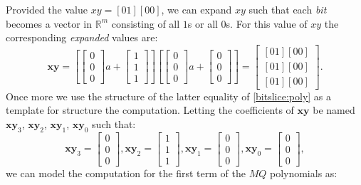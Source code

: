 Provided the value $xy = [01][00]$, we can expand $xy$ such that each \textit{bit} becomes a vector in $\mathbb{R}^m$ consisting of all $1$s or all $0$s. For this value of $xy$ the corresponding \textit{expanded} values are:
$$
    \textbf{xy} = 
    [
    \begin{bmatrix}
        0\\
        0\\
        0
    \end{bmatrix}a
    + 
    \begin{bmatrix}
        1\\
        1\\
        1
    \end{bmatrix} ]
    [
    \begin{bmatrix}
        0\\
        0\\
        0
    \end{bmatrix}a
    + 
    \begin{bmatrix}
        0\\
        0\\
        0
    \end{bmatrix} 
    ] = \begin{bmatrix}
        [01][00]\\
        [01][00]\\
        [01][00]
    \end{bmatrix}.
$$
Once more we use the structure of the latter equality of \cref{bitslice:poly} as a template for structure the computation. Letting the coefficients of $\textbf{xy}$ be named $\textbf{xy}_3$, $\textbf{xy}_2$, $\textbf{xy}_1$, $\textbf{xy}_0$ such that:
$$
    \textbf{xy}_3 = \begin{bmatrix} 0\\ 0\\ 0 \end{bmatrix}, \textbf{xy}_2 = \begin{bmatrix} 1\\ 1\\ 1 \end{bmatrix}, \textbf{xy}_1 = \begin{bmatrix} 0\\ 0\\ 0 \end{bmatrix}, \textbf{xy}_0 = \begin{bmatrix} 0\\ 0\\ 0 \end{bmatrix},
$$
we can model the computation for the first term of the $MQ$ polynomials as:
